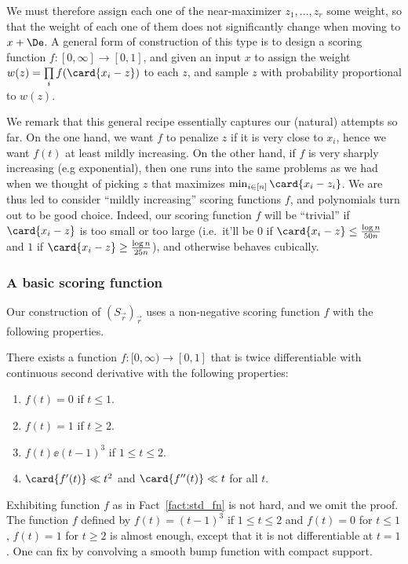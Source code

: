 We must therefore assign each one of the near-maximizer $z_1,\ldots,z_r$ some weight, so that the weight of each one of them does not significantly change when
moving to $x+\De$. A general form of construction of this type is to design a scoring function $f\colon[0,\infty]\to[0,1]$, and given an input $x$ to assign
the weight $w(z) = \prod\limits_{i}{f(\card{x_i - z})}$ to each $z$, and sample $z$ with probability proportional to $w(z)$.

We remark that this general recipe essentially captures our (natural) attempts so far. On the one hand, we want $f$ to penalize $z$
if it is very close to $x_i$, hence we want $f(t)$ at least mildly increasing. On the other hand, if $f$ is very sharply increasing (e.g exponential),
then one runs into the same problems as we had when we thought of picking $z$ that maximizes $\min_{i\in[n]}{\card{x_i - z_i}}$. We are thus
led to consider ``mildly increasing'' scoring functions $f$, and polynomials turn out to be good choice. Indeed, our scoring function $f$ will
be ``trivial'' if $\card{x_i - z}$ is too small or too large (i.e.\ it'll be $0$ if $\card{x_i-z}\leq \frac{\log n}{50 n}$ and $1$ if
$\card{x_i-z}\geq \frac{\log n}{25 n}$), and otherwise behaves cubically.

\subsubsection{A basic scoring function}
Our construction of $(S_{\vec{r}})_{\vec{r}}$ uses a non-negative scoring function $f$ with the following properties.
\begin{fact}\label{fact:std_fn}
There exists a function $f\colon [0,\infty)\to [0,1]$ that is twice differentiable with
continuous second derivative with the following properties:
\begin{enumerate}
  \item $f(t) = 0$ if $t\leq 1$.
  \item $f(t) = 1$ if $t\geq 2$.
  \item $f(t) \ee (t-1)^3$ if $1\leq t\leq 2$.
  \item $\card{f'(t)}\ll t^2$ and $\card{f''(t)}\ll t$ for all $t$.
\end{enumerate}
\end{fact}
Exhibiting function $f$ as in Fact~\ref{fact:std_fn} is not hard, and we omit the proof.
The function $f$ defined by $f(t) = (t-1)^3$ if $1\leq t\leq 2$ and $f(t) = 0$ for $t\leq 1$,
$f(t) = 1$ for $t\geq 2$ is almost enough, except that it is not differentiable at $t=1$. One
can fix by convolving a smooth bump function with compact support.


